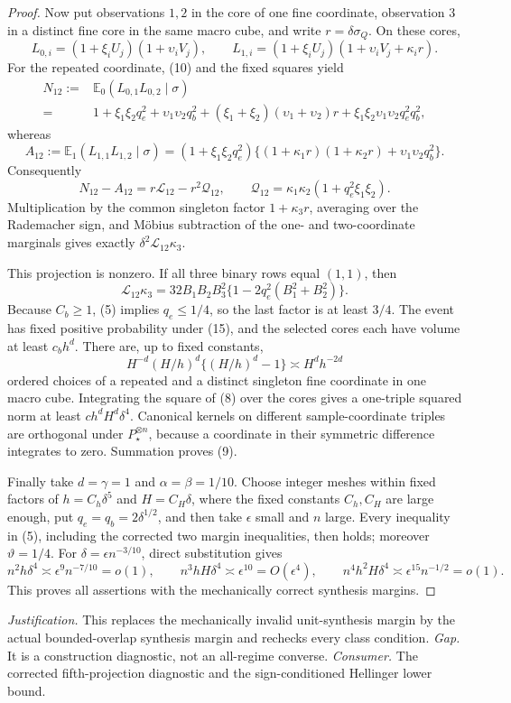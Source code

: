 \documentclass{article}
\begin{document}
\begin{proof}
Now put observations \(1,2\) in the core of one fine coordinate, observation \(3\) in a distinct fine core in the same macro cube, and write \(r=\delta\sigma_Q\).  On these cores,
\[
 L_{0,i}=(1+\xi_iU_j)(1+\upsilon_iV_j),
 \qquad
 L_{1,i}=(1+\xi_iU_j)(1+\upsilon_iV_j+\kappa_ir).
\]
For the repeated coordinate, (10) and the fixed squares yield
\[
 \begin{aligned}
 N_{12}:={}&\mathbb E_0(L_{0,1}L_{0,2}\mid\sigma)\\
 ={}&1+\xi_1\xi_2q_e^2+\upsilon_1\upsilon_2q_b^2
 +(\xi_1+\xi_2)(\upsilon_1+\upsilon_2)r
 +\xi_1\xi_2\upsilon_1\upsilon_2q_e^2q_b^2,
 \end{aligned}
 \tag{19}
\]
whereas
\[
 A_{12}:=\mathbb E_1(L_{1,1}L_{1,2}\mid\sigma)
 =(1+\xi_1\xi_2q_e^2)
 \{(1+\kappa_1r)(1+\kappa_2r)+\upsilon_1\upsilon_2q_b^2\}.
 \tag{20}
\]
Consequently
\[
 N_{12}-A_{12}=r\mathcal L_{12}-r^2\mathcal Q_{12},
 \qquad
 \mathcal Q_{12}=\kappa_1\kappa_2(1+q_e^2\xi_1\xi_2).
 \tag{21}
\]
Multiplication by the common singleton factor \(1+\kappa_3r\), averaging over the Rademacher sign, and Möbius subtraction of the one- and two-coordinate marginals gives exactly \(\delta^2\mathcal L_{12}\kappa_3\).

This projection is nonzero.  If all three binary rows equal \((1,1)\), then
\[
 \mathcal L_{12}\kappa_3
 =32B_1B_2B_3^2\{1-2q_e^2(B_1^2+B_2^2)\}.
 \tag{22}
\]
Because \(C_b\geq1\), (5) implies \(q_e\leq1/4\), so the last factor is at least \(3/4\).  The event has fixed positive probability under (15), and the selected cores each have volume at least \(c_bh^d\).  There are, up to fixed constants,
\[
 H^{-d}(H/h)^d\{(H/h)^d-1\}\asymp H^dh^{-2d}
\]
ordered choices of a repeated and a distinct singleton fine coordinate in one macro cube.  Integrating the square of (8) over the cores gives a one-triple squared norm at least \(ch^dH^d\delta^4\).  Canonical kernels on different sample-coordinate triples are orthogonal under \(P_\star^{\otimes n}\), because a coordinate in their symmetric difference integrates to zero.  Summation proves (9).

Finally take \(d=\gamma=1\) and \(\alpha=\beta=1/10\).  Choose integer meshes within fixed factors of \(h=C_h\delta^5\) and \(H=C_H\delta\), where the fixed constants \(C_h,C_H\) are large enough, put \(q_e=q_b=2\delta^{1/2}\), and then take \(\epsilon\) small and \(n\) large.  Every inequality in (5), including the corrected two margin inequalities, then holds; moreover \(\vartheta=1/4\).  For \(\delta=\epsilon n^{-3/10}\), direct substitution gives
\[
 n^2h\delta^4\asymp\epsilon^9n^{-7/10}=o(1),
 \qquad
 n^3hH\delta^4\asymp\epsilon^{10}=O(\epsilon^4),
 \qquad
 n^4h^2H\delta^4\asymp\epsilon^{15}n^{-1/2}=o(1).
\]
This proves all assertions with the mechanically correct synthesis margins.
\end{proof}
\par\smallskip\noindent \textit{Justification.} This replaces the mechanically invalid unit-synthesis margin by the actual bounded-overlap synthesis margin and rechecks every class condition. \textit{Gap.} It is a construction diagnostic, not an all-regime converse. \textit{Consumer.} The corrected fifth-projection diagnostic and the sign-conditioned Hellinger lower bound.
\end{document}
